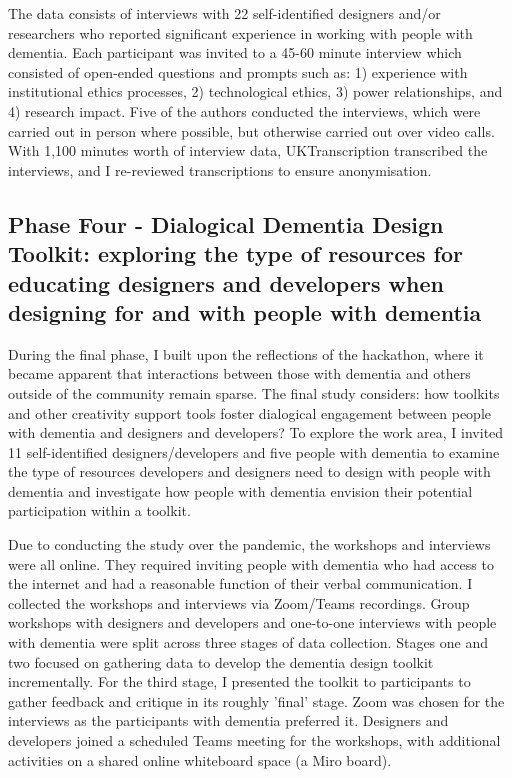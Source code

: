 The data consists of interviews with 22 self-identified designers and/or researchers who reported significant experience in working with people with dementia. Each participant was invited to a 45-60 minute interview which consisted of open-ended questions and prompts such as: 1) experience with institutional ethics processes, 2) technological ethics,
3) power relationships, and 4) research impact. Five of the authors conducted the interviews, which were carried out in person where possible, but otherwise carried out over video calls. With 1,100 minutes worth of interview data, UKTranscription transcribed the interviews, and I re-reviewed transcriptions to ensure anonymisation.


\subsection{Phase Four - Dialogical Dementia Design Toolkit: exploring the type of resources for educating designers and developers when designing for and with people with dementia}

During the final phase, I built upon the reflections of the hackathon, where it became apparent that interactions between those with dementia and others outside of the community remain sparse. The final study considers: how toolkits and other creativity support tools foster dialogical engagement between people with dementia and designers and developers? To explore the work area, I invited 11 self-identified designers/developers and five people with dementia to examine the type of resources developers and designers need to design with people with dementia and investigate how people with dementia envision their potential participation within a toolkit.

Due to conducting the study over the pandemic, the workshops and interviews were all online. They required inviting people with dementia who had access to the internet and had a reasonable function of their verbal communication. I collected the workshops and interviews via Zoom/Teams recordings. Group workshops with designers and developers and one-to-one interviews with people with dementia were split across three stages of data collection. Stages one and two focused on gathering data to develop the dementia design toolkit incrementally. For the third stage, I presented the toolkit to participants to gather feedback and critique in its roughly 'final' stage. Zoom was chosen for the interviews as the participants with dementia preferred it. Designers and developers joined a scheduled Teams meeting for the workshops, with additional activities on a shared online whiteboard space (a Miro board).


